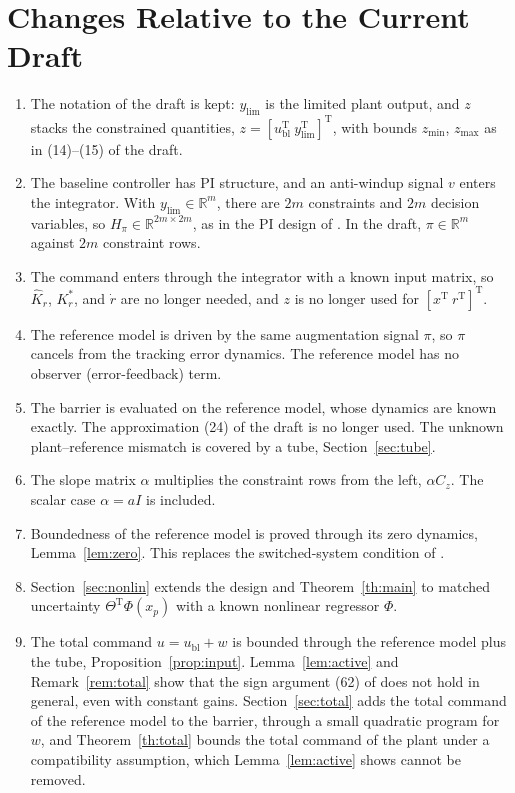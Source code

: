 \documentclass[lettersize,journal]{IEEEtran}
\newcommand{\Kh}{\hat{K}}
\newcommand{\ub}{u_{\mathrm{bl}}}
\newcommand{\ylim}{y_{\mathrm{lim}}}
\newcommand{\T}{\mathrm{T}}
\newcommand{\R}{\mathbb{R}}
\begin{document}
\section{Changes Relative to the Current Draft}

{\color{blue}
\begin{enumerate}
\item The notation of the draft is kept: $\ylim$ is the limited plant output, and $z$ stacks the constrained quantities, $z=[\ub^\T\ \ylim^\T]^\T$, with bounds $z_{\min}$, $z_{\max}$ as in (14)--(15) of the draft.
\item The baseline controller has PI structure, and an anti-windup signal $v$ enters the integrator. With $\ylim\in\R^m$, there are $2m$ constraints and $2m$ decision variables, so $H_\pi\in\R^{2m\times 2m}$, as in the PI design of \cite{menner2026,lavretsky2025}. In the draft, $\pi\in\R^m$ against $2m$ constraint rows.
\item The command enters through the integrator with a known input matrix, so $\Kh_r$, $K_r^*$, and $\dot r$ are no longer needed, and $z$ is no longer used for $[x^\T\ r^\T]^\T$.
\item The reference model is driven by the same augmentation signal $\pi$, so $\pi$ cancels from the tracking error dynamics. The reference model has no observer (error-feedback) term.
\item The barrier is evaluated on the reference model, whose dynamics are known exactly. The approximation (24) of the draft is no longer used. The unknown plant--reference mismatch is covered by a tube, Section~\ref{sec:tube}.
\item The slope matrix $\alpha$ multiplies the constraint rows from the left, $\alpha C_z$. The scalar case $\alpha=aI$ is included.
\item Boundedness of the reference model is proved through its zero dynamics, Lemma~\ref{lem:zero}. This replaces the switched-system condition of \cite[Th.~2.3]{lavretsky2025}.
\item Section~\ref{sec:nonlin} extends the design and Theorem~\ref{th:main} to matched uncertainty $\Theta^\T\Phi(x_p)$ with a known nonlinear regressor $\Phi$.
\item The total command $u=\ub+w$ is bounded through the reference model plus the tube, Proposition~\ref{prop:input}. Lemma~\ref{lem:active} and Remark~\ref{rem:total} show that the sign argument (62) of \cite{lavretsky2025} does not hold in general, even with constant gains. Section~\ref{sec:total} adds the total command of the reference model to the barrier, through a small quadratic program for $w$, and Theorem~\ref{th:total} bounds the total command of the plant under a compatibility assumption, which Lemma~\ref{lem:active} shows cannot be removed.

\end{enumerate}}
\end{document}
